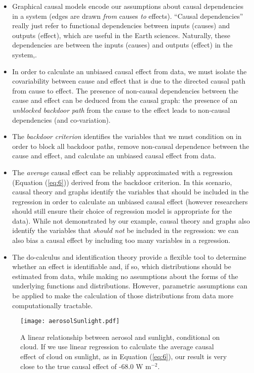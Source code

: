 \documentclass[12pt]{article}
\begin{document}
\begin{itemize}
\item Graphical causal models encode our assumptions about causal
  dependencies in a system (edges are drawn \emph{from} causes
  \emph{to} effects). ``Causal dependencies'' really just refer to
  functional dependencies between inputs (causes) and outputs
  (effect), which are useful in the Earth sciences. Naturally, these dependencies are between the inputs
  (causes) and outputs (effect) in the system,.
\item In order to calculate an unbiased causal effect from data, we
  must isolate the covariability between cause and effect that is due
  to the directed causal path from cause to effect. The presence of
  non-causal dependencies between the cause and effect can be deduced
  from the causal graph: the presence of an \textit{unblocked backdoor
    path} from the cause to the effect leads to non-causal
  dependencies (and co-variation).
\item The \emph{backdoor criterion} identifies the variables that we
  must condition on in order to block all backdoor paths, remove
  non-causal dependence between the cause and effect, and calculate an
  unbiased causal effect from data.
\item The \emph{average} causal effect can be reliably approximated
  with a regression (Equation (\ref{eq:6})) derived from the backdoor
  criterion. In this scenario, causal theory and graphs identify the
  variables that should be included in the regression in order to
  calculate an unbiased causal effect (however researchers should
  still ensure their choice of regression model is appropriate for the
  data). While not demonstrated by our example, causal theory and
  graphs also identify the variables that \textit{should not} be
  included in the regression: we can also bias a causal effect by
  including too many variables in a regression.
\item The do-calculus and identification theory provide a flexible
  tool to determine whether an effect is identifiable and, if so,
  which distributions should be estimated from data, while making no
  assumptions about the forms of the underlying functions and
  distributions. However, parametric assumptions can be applied to
  make the calculation of those distributions from data more
  computationally tractable.
\end{itemize}

\begin{figure} \texttt{[image: aerosolSunlight.pdf]}
  \caption{A linear relationship between aerosol and sunlight,
    conditional on cloud. If we use linear regression to calculate the
    average causal effect of cloud on sunlight, as in Equation
    (\ref{eq:6}), our result is very close to the true causal effect of
    -68.0 W m$^{-2}$.}
  \label{fig:linear}
\end{figure}
\end{document}
